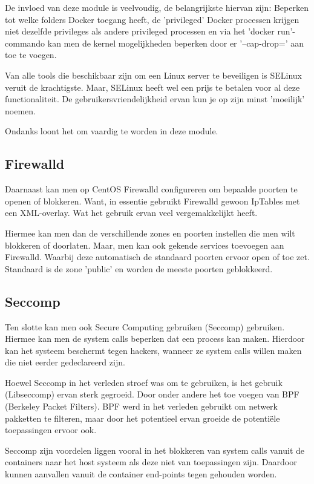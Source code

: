 De invloed van deze module is veelvoudig, de belangrijkste hiervan zijn:
Beperken tot welke folders Docker toegang heeft, de 'privileged' Docker processen krijgen niet dezelfde privileges als andere privileged processen en via het 'docker run'-commando kan men de kernel mogelijkheden beperken door er '--cap-drop=' aan toe te voegen.

Van alle tools die beschikbaar zijn om een Linux server te beveiligen is SELinux veruit de krachtigste. Maar, SELinux heeft wel een prijs te betalen voor al deze functionaliteit. De gebruikersvriendelijkheid ervan kun je op zijn minst 'moeilijk' noemen.

Ondanks loont het om vaardig te worden in deze module.

\subsection{Firewalld}
Daarnaast kan men op CentOS Firewalld configureren om bepaalde poorten te openen of blokkeren. Want, in essentie gebruikt Firewalld gewoon IpTables met een XML-overlay. Wat het gebruik ervan veel vergemakkelijkt heeft. 

Hiermee kan men dan de verschillende zones en poorten instellen die men wilt blokkeren of doorlaten. Maar, men kan ook gekende services toevoegen aan Firewalld. Waarbij deze automatisch de standaard poorten ervoor open of toe zet. Standaard is de zone 'public' en worden de meeste poorten geblokkeerd. 

\subsection{Seccomp}
Ten slotte kan men ook Secure Computing gebruiken (Seccomp) gebruiken. Hiermee kan men de system calls beperken dat een process kan maken. Hierdoor kan het systeem beschermt tegen hackers, wanneer ze system calls willen maken die niet eerder gedeclareerd zijn.

Hoewel Seccomp in het verleden stroef was om te gebruiken, is het gebruik (Libseccomp) ervan sterk gegroeid. Door onder andere het toe voegen van BPF (Berkeley Packet Filters). BPF werd in het verleden gebruikt om netwerk pakketten te filteren, maar door het potentieel ervan groeide de potentiële toepassingen ervoor ook.

Seccomp zijn voordelen liggen vooral in het blokkeren van system calls vanuit de containers naar het host systeem als deze niet van toepassingen zijn. Daardoor kunnen aanvallen vanuit de container end-points tegen gehouden worden.

